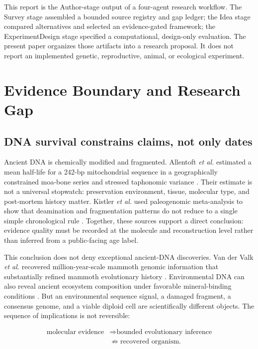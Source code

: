 \documentclass[conference]{IEEEtran}
\begin{document}
This report is the Author-stage output of a four-agent research workflow. The Survey stage assembled a bounded source registry and gap ledger; the Idea stage compared alternatives and selected an evidence-gated framework; the ExperimentDesign stage specified a computational, design-only evaluation. The present paper organizes those artifacts into a research proposal. It does not report an implemented genetic, reproductive, animal, or ecological experiment.

\section{Evidence Boundary and Research Gap}

\subsection{DNA survival constrains claims, not only dates}

Ancient DNA is chemically modified and fragmented. Allentoft \emph{et al.} estimated a mean half-life for a 242-bp mitochondrial sequence in a geographically constrained moa-bone series and stressed taphonomic variance \cite{allentoft2012}. Their estimate is not a universal stopwatch: preservation environment, tissue, molecular type, and post-mortem history matter. Kistler \emph{et al.} used paleogenomic meta-analysis to show that deamination and fragmentation patterns do not reduce to a single simple chronological rule \cite{kistler2017}. Together, these sources support a direct conclusion: evidence quality must be recorded at the molecule and reconstruction level rather than inferred from a public-facing age label.

This conclusion does not deny exceptional ancient-DNA discoveries. Van der Valk \emph{et al.} recovered million-year-scale mammoth genomic information that substantially refined mammoth evolutionary history \cite{vanderValk2021}. Environmental DNA can also reveal ancient ecosystem composition under favorable mineral-binding conditions \cite{kjaer2022}. But an environmental sequence signal, a damaged fragment, a consensus genome, and a viable diploid cell are scientifically different objects. The sequence of implications is not reversible:

\begin{equation}
\begin{aligned}
\text{molecular evidence} &\Rightarrow \text{bounded evolutionary inference}\\
&\not\Rightarrow \text{recovered organism}.
\end{aligned}
\label{eq:dna-boundary}
\end{equation}
\end{document}
